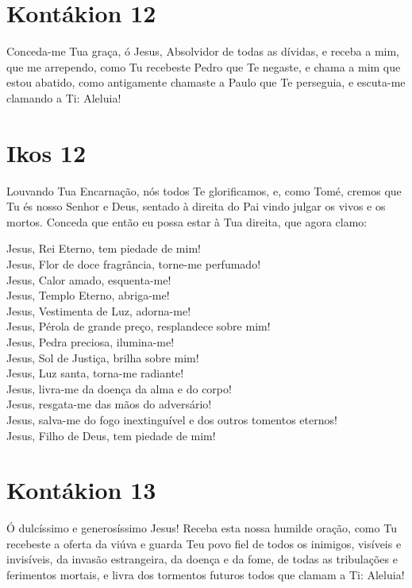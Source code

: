 \documentclass{subfiles}
\begin{document}
\section*{Kontákion 12}

Conceda-me Tua graça, ó Jesus, Absolvidor de todas as dívidas, e
receba a mim, que me arrependo, como Tu recebeste Pedro que Te negaste, e
chama a mim que estou abatido, como antigamente chamaste a Paulo que Te
perseguia, e escuta-me clamando a Ti: Aleluia!

\section*{Ikos 12}

Louvando Tua Encarnação, nós todos Te glorificamos, e, como Tomé,
cremos que Tu és nosso Senhor e Deus, sentado à direita do Pai vindo julgar
os vivos e os mortos. Conceda que então eu possa estar à Tua direita, que
agora clamo:

Jesus, Rei Eterno, tem piedade de mim! \\
Jesus, Flor de doce fragrância, torne-me perfumado! \\
Jesus, Calor amado, esquenta-me! \\
Jesus, Templo Eterno, abriga-me! \\
Jesus, Vestimenta de Luz, adorna-me! \\
Jesus, Pérola de grande preço, resplandece sobre mim! \\
Jesus, Pedra preciosa, ilumina-me! \\
Jesus, Sol de Justiça, brilha sobre mim! \\
Jesus, Luz santa, torna-me radiante! \\
Jesus, livra-me da doença da alma e do corpo! \\
Jesus, resgata-me das mãos do adversário! \\
Jesus, salva-me do fogo inextinguível e dos outros tomentos eternos! \\
Jesus, Filho de Deus, tem piedade de mim!

\section*{Kontákion 13}

Ó dulcíssimo e generosíssimo Jesus! Receba esta nossa humilde
oração, como Tu recebeste a oferta da viúva e guarda Teu povo fiel de todos
os inimigos, visíveis e invisíveis, da invasão estrangeira, da doença e da fome,
de todas as tribulações e ferimentos mortais, e livra dos tormentos futuros
todos que clamam a Ti: Aleluia! 
\end{document}
